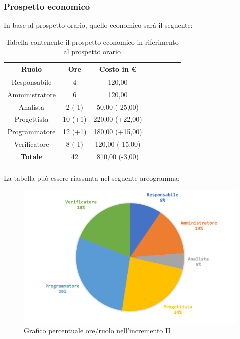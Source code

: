 		\subsubsection{Prospetto economico}
			In base al prospetto orario, quello economico sarà il seguente: 
			
			\begin{longtable}{|c|c|c|c|c|c|c|c}
				\hline
				\rowcolor{lighter-grayer}
				\textbf{Ruolo} & \textbf{Ore} & \textbf{Costo in €} \\
				\hline
				\endfirsthead
				\hline
			Responsabile 	    & 4 & 120,00\\
			\hline 
			\hline
			Amministratore	  & 6 & 120,00\\
			\hline
			\hline
			Analista 				& 2 (-1) & 50,00 (-25,00) \\
			\hline
			\hline
			Progettista 		  & 10 (+1) & 220,00 (+22,00)\\
			\hline
			\hline
			Programmatore 	 & 12 (+1) & 180,00 (+15,00)\\
			\hline
			\hline
			Verificatore 		  & 8 (-1) & 120,00 (-15,00) \\
			\hline
			\textbf{Totale} 	& 42 & 810,00 (-3,00) \\
			\hline
				
				\caption{Tabella contenente il prospetto economico in riferimento al prospetto orario}
			\end{longtable}
			
			La tabella può essere riassunta nel seguente areogramma:
			\begin{figure}[H]
				\centering
				\includegraphics[width=0.8\linewidth]{images/consuntivo/ConsIncr2-2.png}
				\caption{Grafico percentuale ore/ruolo nell'incremento II}
				\label{fig:consuntivo grafico costi ruolo incremento II}
			\end{figure}
			\pagebreak

